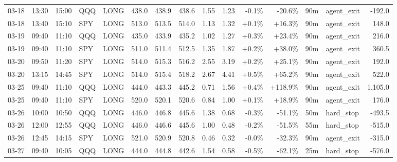 \documentclass[11pt,a4paper,twoside]{article}
\begin{document}
\begin{landscape}
\begin{center}
\begin{longtable}{>{\color{txtmain}}l l l l l r r r r r r r r >{\color{txtmain}}l r}
03-18 & 13:30 & 15:00 & QQQ & LONG & 438.0 & 438.9 & 438.6 & 1.55 & 1.23 & \textcolor{lossred}{-0.1\%} & \textcolor{lossred}{-20.6\%} & 90m & agent\_exit & \textcolor{lossred}{-192.0} \\
03-18 & 13:40 & 15:10 & SPY & LONG & 513.0 & 513.5 & 514.0 & 1.13 & 1.32 & \textcolor{wingreen}{+0.1\%} & \textcolor{wingreen}{+16.3\%} & 90m & agent\_exit & \textcolor{wingreen}{148.0} \\
03-19 & 09:40 & 11:10 & QQQ & LONG & 435.0 & 433.9 & 435.2 & 1.02 & 1.27 & \textcolor{wingreen}{+0.3\%} & \textcolor{wingreen}{+23.4\%} & 90m & agent\_exit & \textcolor{wingreen}{216.0} \\
03-19 & 09:40 & 11:10 & SPY & LONG & 511.0 & 511.4 & 512.5 & 1.35 & 1.87 & \textcolor{wingreen}{+0.2\%} & \textcolor{wingreen}{+38.0\%} & 90m & agent\_exit & \textcolor{wingreen}{360.5} \\
03-20 & 09:50 & 11:20 & SPY & LONG & 514.0 & 515.3 & 516.2 & 2.55 & 3.19 & \textcolor{wingreen}{+0.2\%} & \textcolor{wingreen}{+25.1\%} & 90m & agent\_exit & \textcolor{wingreen}{192.0} \\
03-20 & 13:15 & 14:45 & SPY & LONG & 514.0 & 515.4 & 518.2 & 2.67 & 4.41 & \textcolor{wingreen}{+0.5\%} & \textcolor{wingreen}{+65.2\%} & 90m & agent\_exit & \textcolor{wingreen}{522.0} \\
03-25 & 09:40 & 11:10 & QQQ & LONG & 444.0 & 443.3 & 445.2 & 0.71 & 1.56 & \textcolor{wingreen}{+0.4\%} & \textcolor{wingreen}{+118.9\%} & 90m & agent\_exit & \textcolor{wingreen}{1,105.0} \\
03-25 & 09:40 & 11:10 & SPY & LONG & 520.0 & 520.1 & 520.6 & 0.84 & 1.00 & \textcolor{wingreen}{+0.1\%} & \textcolor{wingreen}{+18.9\%} & 90m & agent\_exit & \textcolor{wingreen}{176.0} \\
03-26 & 10:00 & 10:50 & QQQ & LONG & 446.0 & 446.8 & 445.6 & 1.38 & 0.68 & \textcolor{lossred}{-0.3\%} & \textcolor{lossred}{-51.1\%} & 50m & hard\_stop & \textcolor{lossred}{-493.5} \\
03-26 & 12:00 & 12:55 & QQQ & LONG & 446.0 & 446.6 & 445.6 & 1.00 & 0.48 & \textcolor{lossred}{-0.2\%} & \textcolor{lossred}{-51.5\%} & 55m & hard\_stop & \textcolor{lossred}{-515.0} \\
03-26 & 12:45 & 14:15 & SPY & LONG & 521.0 & 520.9 & 520.8 & 0.46 & 0.32 & \textcolor{lossred}{-0.0\%} & \textcolor{lossred}{-32.3\%} & 90m & agent\_exit & \textcolor{lossred}{-315.0} \\
03-27 & 09:40 & 10:05 & QQQ & LONG & 444.0 & 444.8 & 442.6 & 1.54 & 0.58 & \textcolor{lossred}{-0.5\%} & \textcolor{lossred}{-62.1\%} & 25m & hard\_stop & \textcolor{lossred}{-576.0} \\

\end{longtable}
\end{center}
\end{landscape}
\end{document}
